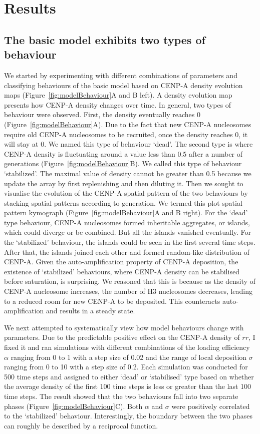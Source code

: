 \section{Results}
\subsection{The basic model exhibits two types of behaviour}

We started by experimenting with different combinations of parameters and classifying behaviours of the basic model based on CENP-A density evolution maps (Figure~\ref{fig:modelBehaviour}A and B left). A density evolution map presents how CENP-A density changes over time. In general, two types of behaviour were observed. First, the density eventually
reaches 0 (Figure~\ref{fig:modelBehaviour}A). Due to the fact that new CENP-A nucleosomes require old CENP-A nucleosomes to be recruited, once the density reaches 0, it will stay at 0. We named this type of behaviour ‘dead’. The second type is where CENP-A density is fluctuating around a value less than 0.5 after a number of generations (Figure~\ref{fig:modelBehaviour}B). We called this type of behaviour ‘stabilized’. The maximal value of density cannot be greater than 0.5 because we update the array by first replenishing and then diluting it. Then we sought to visualise the evolution of the CENP-A spatial pattern of the two behaviours by stacking spatial patterns according to generation. We termed this plot spatial pattern kymograph (Figure~\ref{fig:modelBehaviour}A and B right). For the ‘dead’ type behaviour, CENP-A nucleosomes formed inheritable aggregates, or islands, which could diverge or be combined. But all the islands vanished eventually. For the ‘stabilized’ behaviour, the islands could be seen in the first several time steps. After that, the islands joined each other and formed random-like distribution of CENP-A. Given the auto-amplification property of CENP-A deposition, the existence of ‘stabilized’ behaviours, where CENP-A density can be stabilised before saturation, is surprising. We reasoned that this is because as the density of CENP-A nucleosome increases, the number of H3 nucleosomes decreases, leading to a reduced room for new CENP-A to be deposited. This counteracts auto-amplification and results in a steady state. 

We next attempted to systematically view how model behaviours change with parameters. Due to the predictable positive effect on the CENP-A density of $rr$, I fixed it and ran simulations with different combinations of the loading efficiency $\alpha$ ranging from 0 to 1 with a step size of 0.02 and the range of local deposition $\sigma$ ranging from 0 to 10 with a step size of 0.2. Each simulation was conducted for 500 time steps and assigned to either ‘dead’ or ‘stabilised’ type based on whether the average density of the first 100 time steps is less or greater than the last 100 time steps. The result showed that the two behaviours fall into two separate phases (Figure~\ref{fig:modelBehaviour}C). Both $\alpha$ and $\sigma$ were positively correlated to the ‘stabilized’ behaviour. Interestingly, the boundary between the two phases can roughly be described by a reciprocal function.

